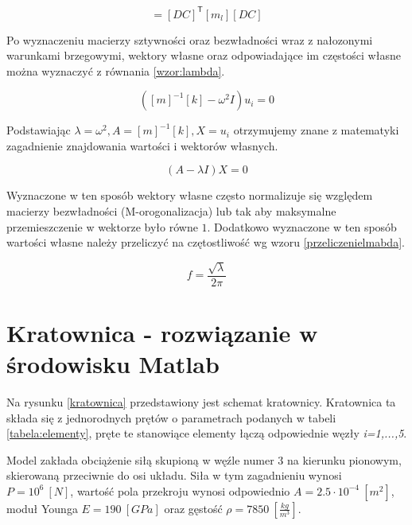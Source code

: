 \documentclass[12pt, a4papper, twoside]{article}
\begin{document}
\begin{equation}
   [m_{g}] = [DC]^\mathsf{T}[m_{l}][DC]
    \label{wzor:bezwladglobalna}
\end{equation}

Po wyznaczeniu macierzy sztywności oraz bezwładności wraz z nałozonymi warunkami brzegowymi, wektory własne oraz odpowiadające im częstości własne można wyznaczyć z równania \ref{wzor:lambda}.

\begin{equation}
([m]^{-1}[k] - \omega^2 I){u_{i}}=0
\end{equation}

Podstawiając $ \lambda = \omega^2, A=[m]^{-1}[k], X={u_{i}}$ otrzymujemy znane z matematyki zagadnienie znajdowania wartości i wektorów własnych.

\begin{equation}
   (A-\lambda I)X=0
    \label{wzor:lambda}
\end{equation}

Wyznaczone w ten sposób wektory własne często normalizuje się względem macierzy bezwładności (M-orogonalizacja) lub tak aby maksymalne przemieszczenie w wektorze było równe $1$. Dodatkowo wyznaczone w ten sposób wartości własne należy przeliczyć na czętostliwość wg wzoru \ref{przeliczenielmabda}.

\begin{equation}
   f = \frac{\sqrt{\lambda}}{2\pi} 
    \label{przeliczenielmabda}
\end{equation}

\section{Kratownica - rozwiązanie w środowisku Matlab}
\label{sec:matlab}


Na rysunku \ref{kratownica} przedstawiony jest schemat kratownicy. Kratownica ta składa się z jednorodnych prętów o parametrach podanych w tabeli \ref{tabela:elementy}, pręte te stanowiące elementy łączą odpowiednie węzły \textit{i=1,...,5}.

Model zakłada obciążenie siłą skupioną w węźle numer $3$ na kierunku pionowym, skierowaną przeciwnie do osi układu. Siła w tym zagadnieniu wynosi $P=10^6\ [N]$, wartość pola przekroju wynosi odpowiednio $A = 2.5 \cdot 10^{-4}\ [m^2]$, moduł Younga $E = 190\ [GPa]$ oraz gęstość $\rho = 7850\ [\frac{kg}{m^3}]$.
\end{document}
